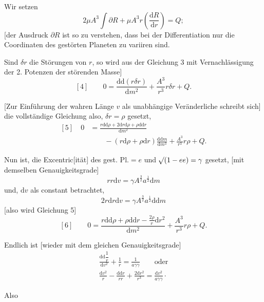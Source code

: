\par
\noindent\hspace*{\parindent}Wir setzen
\[
2\mu A^{3}\int\partial R+\mu A^{3}r\left(\frac{\mathrm{d}R}{\mathrm{d}r}\right)=Q;
\]
[der Ausdruck \(\partial R\) ist so zu verstehen, dass bei der Differentiation nur die Coordinaten des gestörten Planeten zu variiren sind.
\par
\noindent\hspace*{\parindent}Sind \(\delta r\) die Störungen von \(r\), so wird aus der Gleichung 3 mit Vernachlässigung der 2. Potenzen der störenden Masse]
\[
[4]\qquad 0=\frac{\mathrm{d}\mathrm{d}(r\delta r)}{\mathrm{d}m^{2}}+\frac{A^{3}}{r^{3}}r\delta r+Q.
\]
\par
\noindent\hspace*{\parindent}[Zur Einführung der wahren Länge \(v\) als unabhängige Veränderliche schreibt sich] die vollständige Gleichung also, \(\delta r=\rho\) gesetzt,
\[
\begin{aligned}
[5]\quad 0&=\frac{r\mathrm{d}\mathrm{d}\rho+2\mathrm{d}r\mathrm{d}\rho+\rho\mathrm{d}\mathrm{d}r}{\mathrm{d}m^{2}}\\
&\qquad-(r\mathrm{d}\rho+\rho\mathrm{d}r)\frac{\mathrm{d}\mathrm{d}m}{\mathrm{d}m^{3}}+\frac{A^{3}}{r^{3}}r\rho+Q.
\end{aligned}
\]
\par
\noindent\hspace*{\parindent}Nun ist, die Excentric[ität] des gest. Pl.\(=e\) und \(\mathord{{}^{}\!\surd}(1-ee)=\gamma\) gesetzt, [mit demselben Genauigkeitsgrade]
\[
rr\mathrm{d}v=\gamma A^{\frac32}a^{\frac12}\mathrm{d}m
\]
und, \(\mathrm{d}v\) als constant betrachtet,
\[
2r\mathrm{d}r\mathrm{d}v=\gamma A^{\frac32}a^{\frac12}\mathrm{d}\mathrm{d}m
\]
[also wird Gleichung 5]
\[
[6]\qquad 0=\frac{r\mathrm{d}\mathrm{d}\rho+\rho\mathrm{d}\mathrm{d}r-\frac{2\rho}{r}\mathrm{d}r^{2}}{\mathrm{d}m^{2}}+\frac{A^{3}}{r^{3}}r\rho+Q.
\]
\par
\noindent\hspace*{\parindent}Endlich ist [wieder mit dem gleichen Genauigkeitsgrade]
\[
\begin{gathered}
\frac{\mathrm{d}\mathrm{d}\dfrac1r}{\mathrm{d}v^{2}}+\frac1r=\frac1{a\gamma\gamma}\qquad\text{oder}\\[4pt]
\frac{\mathrm{d}v^{2}}{r}-\frac{\mathrm{d}\mathrm{d}r}{rr}+\frac{2\mathrm{d}r^{2}}{r^{3}}=\frac{\mathrm{d}v^{2}}{a\gamma\gamma}\mathpunct{\cdot}
\end{gathered}
\]
\par
\noindent\hspace*{\parindent}Also
